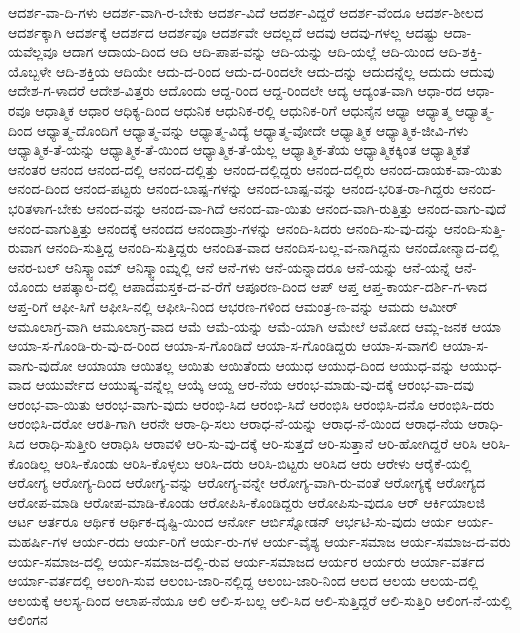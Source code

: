 {ಆದರ್ಶ-ವಾ-ದಿ-ಗಳು
ಆದರ್ಶ-ವಾಗಿ-ರ-ಬೇಕು
ಆದರ್ಶ-ವಿದೆ
ಆದರ್ಶ-ವಿದ್ದರೆ
ಆದರ್ಶ-ವೆಂದೂ
ಆದರ್ಶ-ಶೀಲದ
ಆದರ್ಶಕ್ಕಾಗಿ
ಆದರ್ಶಕ್ಕೆ
ಆದರ್ಶದ
ಆದರ್ಶವೂ
ಆದರ್ಶವೇ
ಆದಲ್ಲದೆ
ಆದವು
ಆದವು-ಗಳಲ್ಲ
ಆದಷ್ಟು
ಆದಾ-ಯವೆಲ್ಲವೂ
ಆದಾಗ
ಆದಾಯ-ದಿಂದ
ಆದಿ
ಆದಿ-ಪಾಪ-ವನ್ನು
ಆದಿ-ಯನ್ನು
ಆದಿ-ಯಲ್ಲೆ
ಆದಿ-ಯಿಂದ
ಆದಿ-ಶಕ್ತಿ-ಯೊಬ್ಬಳೇ
ಆದಿ-ಶಕ್ತಿಯ
ಆದಿಯೇ
ಆದು-ದ-ರಿಂದ
ಆದು-ದ-ರಿಂದಲೇ
ಆದು-ದನ್ನು
ಆದುದನ್ನೆಲ್ಲ
ಆದುದು
ಆದುವು
ಆದೇಶ-ಗ-ಳಾದರೆ
ಆದೇಶ-ವಿತ್ತರು
ಆದೊಂದು
ಆದ್ದ-ರಿಂದ
ಆದ್ದ-ರಿಂದಲೇ
ಆದ್ಯ
ಆದ್ಯಂತ-ವಾಗಿ
ಆಧಾ-ರದ
ಆಧಾ-ರವೂ
ಆಧಾತ್ಮಿಕ
ಆಧಾರ
ಆಧಿಕ್ಯ-ದಿಂದ
ಆಧುನಿಕ
ಆಧುನಿಕ-ರಲ್ಲಿ
ಆಧುನಿಕ-ರಿಗೆ
ಆಧುನೈನ
ಆಧ್ಯಾ
ಆಧ್ಯಾತ್ಮ
ಆಧ್ಯಾತ್ಮ-ದಿಂದ
ಆಧ್ಯಾತ್ಮ-ದೊಂದಿಗೆ
ಆಧ್ಯಾತ್ಮ-ವನ್ನು
ಆಧ್ಯಾತ್ಮ-ವಿದ್ಯೆ
ಆಧ್ಯಾತ್ಮ-ವೋದೇ
ಆಧ್ಯಾತ್ಮಿಕ
ಆಧ್ಯಾತ್ಮಿಕ-ಜೀವಿ-ಗಳು
ಆಧ್ಯಾತ್ಮಿಕ-ತೆ-ಯನ್ನು
ಆಧ್ಯಾತ್ಮಿಕ-ತೆ-ಯಿಂದ
ಆಧ್ಯಾತ್ಮಿಕ-ತೆ-ಯೆಲ್ಲ
ಆಧ್ಯಾತ್ಮಿಕ-ತೆಯ
ಆಧ್ಯಾತ್ಮಿಕಕ್ಕಿಂತ
ಆಧ್ಯಾತ್ಮಿಕತೆ
ಆನಂತರ
ಆನಂದ
ಆನಂದ-ದಲ್ಲಿ
ಆನಂದ-ದಲ್ಲಿತ್ತು
ಆನಂದ-ದಲ್ಲಿದ್ದರು
ಆನಂದ-ದಲ್ಲಿರು
ಆನಂದ-ದಾಯಕ-ವಾ-ಯಿತು
ಆನಂದ-ದಿಂದ
ಆನಂದ-ಪಟ್ಟರು
ಆನಂದ-ಬಾಷ್ಪ-ಗಳನ್ನು
ಆನಂದ-ಬಾಷ್ಪ-ವನ್ನು
ಆನಂದ-ಭರಿತ-ರಾ-ಗಿದ್ದರು
ಆನಂದ-ಭರಿತಳಾಗ-ಬೇಕು
ಆನಂದ-ವನ್ನು
ಆನಂದ-ವಾ-ಗಿದೆ
ಆನಂದ-ವಾ-ಯಿತು
ಆನಂದ-ವಾಗಿ-ರುತ್ತಿತ್ತು
ಆನಂದ-ವಾಗು-ವುದೆ
ಆನಂದ-ವಾಗುತ್ತಿತ್ತು
ಆನಂದಕ್ಕೆ
ಆನಂದದ
ಆನಂದಾಶ್ರು-ಗಳನ್ನು
ಆನಂದಿ-ಸಿದರು
ಆನಂದಿ-ಸು-ವು-ದನ್ನು
ಆನಂದಿ-ಸುತ್ತಿ-ರುವಾಗ
ಆನಂದಿ-ಸುತ್ತಿದ್ದ
ಆನಂದಿ-ಸುತ್ತಿದ್ದರು
ಆನಂದಿತ-ವಾದ
ಆನಂದಿಸ-ಬಲ್ಲ-ವ-ನಾಗಿದ್ದನು
ಆನಂದೋನ್ಮಾದ-ದಲ್ಲಿ
ಆನರ-ಬಲ್
ಆನಿಸ್ಕ್ವಾಂಮ್
ಆನಿಸ್ಕ್ವಾಂಮ್ನಲ್ಲಿ
ಆನೆ
ಆನೆ-ಗಳು
ಆನೆ-ಯನ್ನಾದರೂ
ಆನೆ-ಯನ್ನು
ಆನೆ-ಯನ್ನೆ
ಆನೆ-ಯೊಂದು
ಆಪತ್ಕಾಲ-ದಲ್ಲಿ
ಆಪಾದಮಸ್ತಕ-ದ-ವ-ರೆಗೆ
ಆಪೂರಣ-ದಿಂದ
ಆಪ್
ಆಪ್ತ
ಆಪ್ತ-ಕಾರ್ಯ-ದರ್ಶಿ-ಗ-ಳಾದ
ಆಪ್ತ-ರಿಗೆ
ಆಫೀ-ಸಿಗೆ
ಆಫೀಸಿ-ನಲ್ಲಿ
ಆಫೀಸಿ-ನಿಂದ
ಆಭರಣ-ಗಳಿಂದ
ಆಮಂತ್ರ-ಣ-ವನ್ನು
ಆಮದು
ಆಮೀರ್
ಆಮೂಲಾಗ್ರ-ವಾಗಿ
ಆಮೂಲಾಗ್ರ-ವಾದ
ಆಮೆ
ಆಮೆ-ಯನ್ನು
ಆಮೆ-ಯಾಗಿ
ಆಮೇಲೆ
ಆಮೋದ
ಆಮ್ಲ-ಜನಕ
ಆಯಾ
ಆಯಾ-ಸ-ಗೊಂಡಿ-ರು-ವು-ದ-ರಿಂದ
ಆಯಾ-ಸ-ಗೊಂಡಿದೆ
ಆಯಾ-ಸ-ಗೊಂಡಿದ್ದರು
ಆಯಾ-ಸ-ವಾಗಲಿ
ಆಯಾ-ಸ-ವಾಗು-ವುದೋ
ಆಯಾಯಾ
ಆಯಿತಲ್ಲ
ಆಯಿತು
ಆಯಿತೆಂದು
ಆಯುಧ
ಆಯುಧ-ದಿಂದ
ಆಯುಧ-ವನ್ನು
ಆಯುಧ-ವಾದ
ಆಯುರ್ವೇದ
ಆಯುಷ್ಯ-ವನ್ನೆಲ್ಲ
ಆಯ್ಕೆ
ಆಯ್ದ
ಆರ-ನೆಯ
ಆರಂಭ-ಮಾಡು-ವು-ದಕ್ಕೆ
ಆರಂಭ-ವಾ-ದವು
ಆರಂಭ-ವಾ-ಯಿತು
ಆರಂಭ-ವಾಗು-ವುದು
ಆರಂಭಿ-ಸಿದ
ಆರಂಭಿ-ಸಿದೆ
ಆರಂಭಿಸಿ
ಆರಂಭಿಸಿ-ದನೊ
ಆರಂಭಿಸಿ-ದರು
ಆರಂಭಿಸಿ-ದರೋ
ಆರತಿ-ಗಾಗಿ
ಆರನೇ
ಆರಾ-ಧಿ-ಸಲು
ಆರಾಧ-ನೆ-ಯನ್ನು
ಆರಾಧ-ನೆ-ಯಿಂದ
ಆರಾಧ-ನೆಯ
ಆರಾಧಿ-ಸಿದ
ಆರಾಧಿ-ಸುತ್ತೀರಿ
ಆರಾಧಿಸಿ
ಆರಾವಳಿ
ಆರಿ-ಸು-ವು-ದಕ್ಕೆ
ಆರಿ-ಸುತ್ತದೆ
ಆರಿ-ಸುತ್ತಾನೆ
ಆರಿ-ಹೋಗಿದ್ದರೆ
ಆರಿಸಿ
ಆರಿಸಿ-ಕೊಂಡಿಲ್ಲ
ಆರಿಸಿ-ಕೊಂಡು
ಆರಿಸಿ-ಕೊಳ್ಳಲು
ಆರಿಸಿ-ದರು
ಆರಿಸಿ-ಬಿಟ್ಟರು
ಆರಿಸಿದ
ಆರು
ಆರೇಳು
ಆರೈಕೆ-ಯಲ್ಲಿ
ಆರೋಗ್ಯ
ಆರೋಗ್ಯ-ದಿಂದ
ಆರೋಗ್ಯ-ವನ್ನು
ಆರೋಗ್ಯ-ವನ್ನೇ
ಆರೋಗ್ಯ-ವಾಗಿ-ರು-ವಂತೆ
ಆರೋಗ್ಯಕ್ಕೆ
ಆರೋಗ್ಯದ
ಆರೋಪ-ಮಾಡಿ
ಆರೋಪ-ಮಾಡಿ-ಕೊಂಡು
ಆರೋಪಿಸಿ-ಕೊಂಡಿದ್ದರು
ಆರೋಪಿಸು-ವುದೂ
ಆರ್
ಆರ್ಕಿಯಾಲಜಿ
ಆರ್ಟ
ಆರ್ತರೂ
ಆರ್ಥಿಕ
ಆರ್ಥಿಕ-ದೃಷ್ಟಿ-ಯಿಂದ
ಆರ್ನೋ
ಆರ್ಬಿಸ್ನೋಡನ್
ಆರ್ಭಟಿ-ಸು-ವುದು
ಆರ್ಯ
ಆರ್ಯ-ಮಹರ್ಷಿ-ಗಳ
ಆರ್ಯ-ರದು
ಆರ್ಯ-ರಿಗೆ
ಆರ್ಯ-ರು-ಗಳ
ಆರ್ಯ-ವೈಶ್ಯ
ಆರ್ಯ-ಸಮಾಜ
ಆರ್ಯ-ಸಮಾಜ-ದ-ವರು
ಆರ್ಯ-ಸಮಾಜ-ದಲ್ಲಿ
ಆರ್ಯ-ಸಮಾಜ-ದಲ್ಲಿ-ರುವ
ಆರ್ಯ-ಸಮಾಜದ
ಆರ್ಯರ
ಆರ್ಯರು
ಆರ್ಯಾ-ವರ್ತದ
ಆರ್ಯಾ-ವರ್ತದಲ್ಲಿ
ಆಲಂಗಿ-ಸುವ
ಆಲಂಬ-ಜಾರಿ-ನಲ್ಲಿದ್ದ
ಆಲಂಬ-ಜಾರಿ-ನಿಂದ
ಆಲದ
ಆಲಯ
ಆಲಯ-ದಲ್ಲಿ
ಆಲಯಕ್ಕೆ
ಆಲಸ್ಯ-ದಿಂದ
ಆಲಾಪ-ನೆಯೂ
ಆಲಿ
ಆಲಿ-ಸ-ಬಲ್ಲ
ಆಲಿ-ಸಿದ
ಆಲಿ-ಸುತ್ತಿದ್ದರೆ
ಆಲಿ-ಸುತ್ತಿರಿ
ಆಲಿಂಗ-ನೆ-ಯಲ್ಲಿ
ಆಲಿಂಗನ
}
